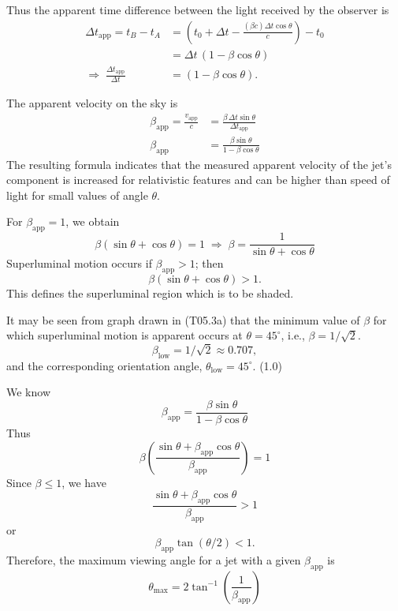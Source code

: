 \begin{description}
  Thus the apparent time difference between the light received by the
  observer is
  \begin{align*}
  \Delta t_{\mathrm{app}} = t_B - t_A
  &= \left(t_0 + \Delta t - \frac{(\beta c)\Delta t \cos\theta}{c}\right)
     - t_0 \\
  &= \Delta t\,(1 - \beta\cos\theta) \\
  \Longrightarrow\;
  \frac{\Delta t_{\mathrm{app}}}{\Delta t}
  &= (1 - \beta\cos\theta).
  \tag*{(2.0)}
  \end{align*}

\item[(T05.2b)] The apparent velocity on the sky is
  \begin{align*}
  \beta_{\mathrm{app}} = \frac{v_{\mathrm{app}}}{c}
  &= \frac{\beta\,\Delta t \sin\theta}{\Delta t_{\mathrm{app}}} \\
  \beta_{\mathrm{app}}
  &= \frac{\beta\sin\theta}{1 - \beta\cos\theta}
  \tag*{(2.0)}
  \end{align*}
  The resulting formula indicates that the measured apparent velocity of the
  jet's component is increased for relativistic features and can be higher
  than speed of light for small values of angle $\theta$.

\item[(T05.3a)] For $\beta_{\mathrm{app}} = 1$, we obtain
  \[
  \beta(\sin\theta + \cos\theta) = 1
  \;\Longrightarrow\;
  \beta = \frac{1}{\sin\theta + \cos\theta}
  \]
  Superluminal motion occurs if $\beta_{\mathrm{app}} > 1$; then
  \[
  \beta(\sin\theta + \cos\theta) > 1.
  \]
  This defines the superluminal region which is to be shaded.

\item[(T05.3b)] It may be seen from graph drawn in (T05.3a) that the minimum
  value of $\beta$ for which superluminal motion is apparent occurs at
  $\theta = 45^\circ$, i.e., $\beta = 1/\sqrt{2}$.
  \begin{equation*}
  \beta_{\mathrm{low}} = 1/\sqrt{2} \approx 0.707,
  \tag*{(1.0)}
  \end{equation*}
  and the corresponding orientation angle,
  $\theta_{\mathrm{low}} = 45^\circ$. \hfill(1.0)

\item[(T05.4)] We know
  \[
  \beta_{\mathrm{app}} = \frac{\beta\sin\theta}{1 - \beta\cos\theta}
  \]
  Thus
  \[
  \beta\left(\frac{\sin\theta + \beta_{\mathrm{app}}\cos\theta}
                  {\beta_{\mathrm{app}}}\right) = 1
  \]
  Since $\beta \le 1$, we have
  \begin{equation*}
  \frac{\sin\theta + \beta_{\mathrm{app}}\cos\theta}{\beta_{\mathrm{app}}} > 1
  \tag*{(1.0)}
  \end{equation*}
  or
  \[
  \beta_{\mathrm{app}} \tan(\theta/2) < 1.
  \]
  Therefore, the maximum viewing angle for a jet with a given
  $\beta_{\mathrm{app}}$ is
  \begin{equation*}
  \theta_{\mathrm{max}}
  = 2\tan^{-1}\!\left(\frac{1}{\beta_{\mathrm{app}}}\right)
  \tag*{(1.0)}
  \end{equation*}


\end{description}
